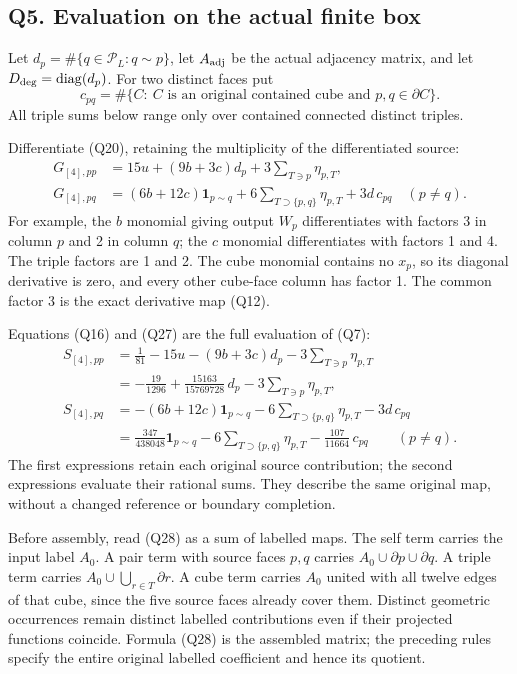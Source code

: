 \documentclass[11pt]{article}
\begin{document}
\subsection*{Q5. Evaluation on the actual finite box}

Let \(d_p=\#\{q\in\mathcal P_L:q\sim p\}\), let \(A_{\rm adj}\) be the actual adjacency matrix, and let \(D_{\rm deg}=\operatorname{diag}(d_p)\). For two distinct faces put
\[
 c_{pq}=\#\{C:\ C\text{ is an original contained cube and }p,q\in\partial C\}.
 \tag{Q26}
\]
All triple sums below range only over contained connected distinct triples.

Differentiate (Q20), retaining the multiplicity of the differentiated source:
\[
 \begin{aligned}
 G_{[4],pp}&=15u+(9b+3c)d_p+3\sum_{T\ni p}\eta_{p,T},\\
 G_{[4],pq}&=(6b+12c)\mathbf1_{p\sim q}
                 +6\sum_{T\supset\{p,q\}}\eta_{p,T}
                 +3d\,c_{pq}\quad(p\ne q).
 \end{aligned}\tag{Q27}
\]
For example, the \(b\) monomial giving output \(W_p\) differentiates with factors 3 in column \(p\) and 2 in column \(q\); the \(c\) monomial differentiates with factors 1 and 4. The triple factors are 1 and 2. The cube monomial contains no \(x_p\), so its diagonal derivative is zero, and every other cube-face column has factor 1. The common factor 3 is the exact derivative map (Q12).

Equations (Q16) and (Q27) are the full evaluation of (Q7):
\[
 \boxed{\begin{aligned}
 S_{[4],pp}
 &=\frac1{81}-15u-(9b+3c)d_p-3\sum_{T\ni p}\eta_{p,T}\\
 &=-\frac{19}{1296}+\frac{15163}{15769728}\,d_p
                          -3\sum_{T\ni p}\eta_{p,T},\\
 S_{[4],pq}
 &=-(6b+12c)\mathbf1_{p\sim q}
                -6\sum_{T\supset\{p,q\}}\eta_{p,T}
                -3d\,c_{pq}\\
 &=\frac{347}{438048}\mathbf1_{p\sim q}
                -6\sum_{T\supset\{p,q\}}\eta_{p,T}
                -\frac{107}{11664}\,c_{pq}\qquad(p\ne q).
 \end{aligned}}\tag{Q28}
\]
The first expressions retain each original source contribution; the second expressions evaluate their rational sums. They describe the same original map, without a changed reference or boundary completion.

Before assembly, read (Q28) as a sum of labelled maps. The self term carries the input label \(A_0\). A pair term with source faces \(p,q\) carries \(A_0\cup\partial p\cup\partial q\). A triple term carries \(A_0\cup\bigcup_{r\in T}\partial r\). A cube term carries \(A_0\) united with all twelve edges of that cube, since the five source faces already cover them. Distinct geometric occurrences remain distinct labelled contributions even if their projected functions coincide. Formula (Q28) is the assembled matrix; the preceding rules specify the entire original labelled coefficient and hence its quotient.
\end{document}
